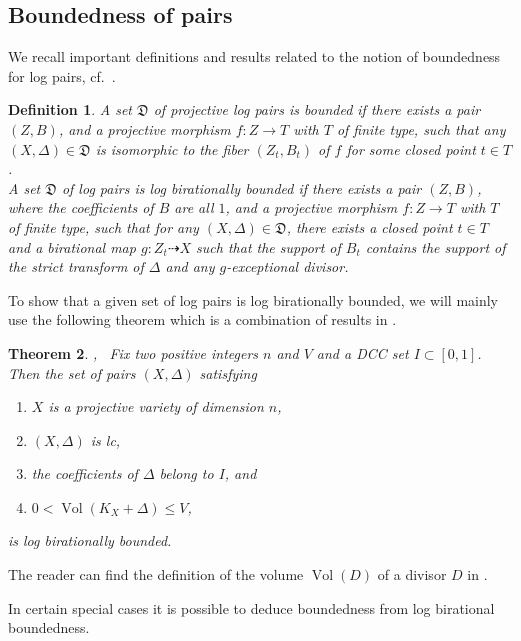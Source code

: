\documentclass{amsart}[12pt,a4paper]
\newtheorem{theorem}{Theorem}[section]
\newtheorem{definition}[theorem]{Definition}
\theoremstyle{definition}
\DeclareMathOperator{\Vol}{\mathrm{Vol}}
\newcommand{\D}{\mathfrak{D}}
\begin{document}
\subsection{Boundedness of pairs}
\label{boundedness.subsec}

We recall important definitions and results related to the notion of boundedness for log pairs, cf.~\cite[Definition~3.5.1]{HMX14}.

\begin{definition}
\label{def.bound}
A set $\D$ of projective log pairs is bounded if there exists a pair $(Z,B)$, and a projective morphism $f\colon Z \rightarrow T$ with $T$ of finite type, such that any $(X,\Delta) \in \D$ is isomorphic to the fiber $(Z_t, B_t)$ of $f$ for some closed point $t\in T$.
\\	
A set $\D$ of log pairs is log birationally bounded if there exists a pair $(Z,B)$, where the coefficients of $B$ are all $1$, and a projective morphism $f \colon Z \rightarrow T$ with $T$ of finite type, such that for any $(X,\Delta) \in \D$, there exists a closed point $t\in T$ and a birational map $g\colon Z_t \dashrightarrow X$ such that the support of $B_t$ contains the  support of the strict transform of $\Delta$ and any $g$-exceptional divisor.
\end{definition}

To show that a given set of log pairs is log birationally bounded, we will mainly use the following theorem which is a combination of results in \cite{HMX13, HMX14}.
\begin{theorem} 
\cite[Theorem~3.1]{HMX13},~\cite[Theorem~1.3]{HMX14} 
\label{main.hmx}
Fix two positive integers $n$ and $V$ and a DCC set $I\subset [0,1]$. Then the set of pairs $(X,\Delta)$ satisfying
	\begin{enumerate}
		\item $X$ is a projective variety of dimension $n$,
		\item $(X, \Delta)$ is lc, 
		\item the coefficients of $\Delta$ belong to $I$, and
		\item $0<\Vol(K_X+\Delta)\leq V$,
	\end{enumerate}
	is log birationally bounded.
\end{theorem}
\noindent
The reader can find the definition of the volume $\Vol(D)$ of a divisor $D$ in \cite[Definition~2.2.31]{Laz}.

In certain special cases it is possible to deduce boundedness from log birational boundedness. 
\end{document}
